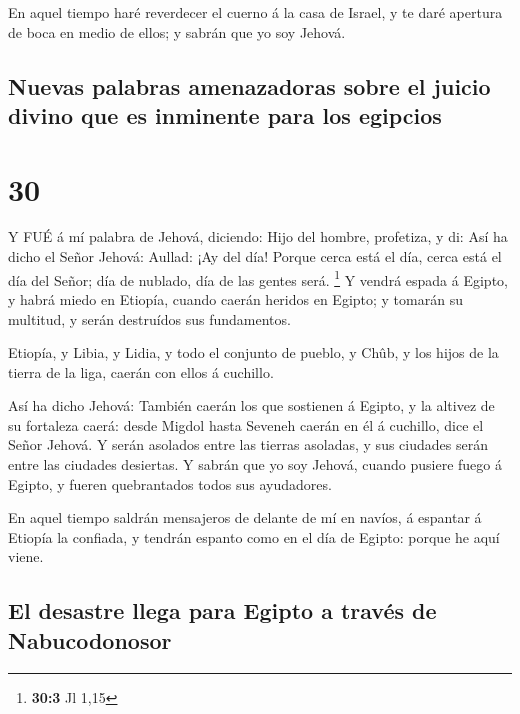  En aquel tiempo haré reverdecer el cuerno á la casa de
Israel, y te daré apertura de boca en medio de ellos; y sabrán que yo
soy Jehová.

\hypertarget{nuevas-palabras-amenazadoras-sobre-el-juicio-divino-que-es-inminente-para-los-egipcios}{%
\subsection{Nuevas palabras amenazadoras sobre el juicio divino que es
inminente para los
egipcios}\label{nuevas-palabras-amenazadoras-sobre-el-juicio-divino-que-es-inminente-para-los-egipcios}}

\hypertarget{section-29}{%
\section{30}\label{section-29}}

 Y FUÉ á mí palabra de Jehová, diciendo:  Hijo
del hombre, profetiza, y di: Así ha dicho el Señor Jehová: Aullad: ¡Ay
del día!  Porque cerca está el día, cerca está el día del
Señor; día de nublado, día de las gentes será. \footnote{\textbf{30:3}
  Jl 1,15}  Y vendrá espada á Egipto, y habrá miedo en
Etiopía, cuando caerán heridos en Egipto; y tomarán su multitud, y serán
destruídos sus fundamentos.

 Etiopía, y Libia, y Lidia, y todo el conjunto de pueblo, y
Chûb, y los hijos de la tierra de la liga, caerán con ellos á cuchillo.

 Así ha dicho Jehová: También caerán los que sostienen á
Egipto, y la altivez de su fortaleza caerá: desde Migdol hasta Seveneh
caerán en él á cuchillo, dice el Señor Jehová.  Y serán
asolados entre las tierras asoladas, y sus ciudades serán entre las
ciudades desiertas.  Y sabrán que yo soy Jehová, cuando
pusiere fuego á Egipto, y fueren quebrantados todos sus ayudadores.

 En aquel tiempo saldrán mensajeros de delante de mí en
navíos, á espantar á Etiopía la confiada, y tendrán espanto como en el
día de Egipto: porque he aquí viene.

\hypertarget{el-desastre-llega-para-egipto-a-travuxe9s-de-nabucodonosor}{%
\subsection{El desastre llega para Egipto a través de
Nabucodonosor}\label{el-desastre-llega-para-egipto-a-travuxe9s-de-nabucodonosor}}


